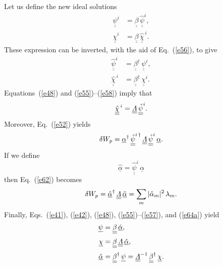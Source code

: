 \documentclass[12pt,prb,aps,notitlepage]{revtex4-1}
\begin{document}
Let us define the new ideal solutions
\begin{align}\label{e57}
\underline{\underline{\psi}}^i&=\underline{\underline{\beta}}\,\underline{\underline{\hat{\psi}}}^i,\\[0.5ex]
\underline{\underline{\chi}}^i&=\underline{\underline{\beta}}\,\underline{\underline{\hat{\chi}}}^{\,i}.\label{e58}
\end{align}
These expression can be inverted, with the aid of Eq.~(\ref{e56}), to give
\begin{align}
\underline{\underline{\hat{\psi}}}^i&=\underline{\underline{\beta}}^\dag\,\underline{\underline{\psi}}^i,\\[0.5ex]
\underline{\underline{\hat{\chi}}}^{\,i}&=\underline{\underline{\beta}}^\dag\,\underline{\underline{\chi}}^{i}.
\end{align}
Equations~(\ref{e48}) and (\ref{e55})--(\ref{e58}) imply that
\begin{equation}
\underline{\underline{\hat{\chi}}}^{\,i}= \underline{\underline{{\mit\Lambda}}}\,\underline{\underline{\hat{\psi}}}^i.
\end{equation}
Moreover, Eq.~(\ref{e52}) yields
\begin{equation}\label{e62}
 \delta W_p= \underline{\alpha}^\dag\,\underline{\underline{\hat{\psi}}}^{i\,\dag}\,\underline{\underline{{\mit\Lambda}}}\,\underline{\underline{\hat{\psi}}}^i\,\underline{\alpha}.
 \end{equation}
 If we define
 \begin{equation}\label{e64a}
\underline{\hat{\alpha}} = \underline{\underline{\hat{\psi}}}^i\,\underline{\alpha}
\end{equation}
then Eq.~(\ref{e62}) becomes
\begin{equation}\label{e64}
 \delta W_p= \underline{\hat{\alpha}}^\dag\,\underline{\underline{{\mit\Lambda}}}\,\underline{\hat{\alpha}}= \sum_m |\hat{\alpha}_m|^2\,\lambda_m.
 \end{equation}
 Finally, Eqs.~(\ref{e41}), (\ref{e42}), (\ref{e48}), (\ref{e55})--(\ref{e57}), and (\ref{e64a}) yield
\begin{align}\label{e65}
\underline{\psi}&= \underline{\underline{\beta}}\,\underline{\hat{\alpha}},\\[0.5ex]
\underline{\chi}&= \underline{\underline{\beta}}\,\underline{\underline{\mit\Lambda}}\,\underline{\hat{\alpha}},\label{e66}\\[0.5ex]
\underline{\hat{\alpha}}&= \underline{\underline{\beta}}^\dag\,\underline{\psi}= \underline{\underline{\mit\Lambda}}^{-1}\,\underline{\underline{\beta}}^\dag\,
\underline{\chi}.
\end{align}
\end{document}
